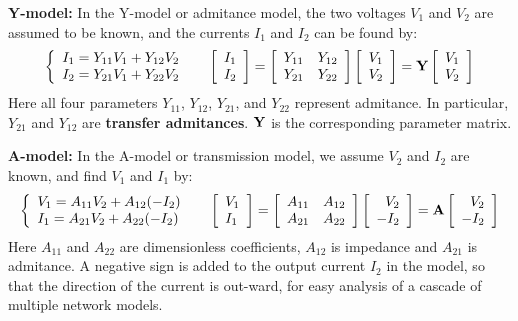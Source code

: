 {\bf Y-model:} In the Y-model or admitance model, the two voltages $V_1$ and $V_2$
are assumed to be known, and the currents $I_1$ and $I_2$ can be found by:
\[ \left\{ \begin{array}{l} I_1=Y_{11}V_1+Y_{12}V_2 \\
	I_2=Y_{21}V_1+Y_{22}V_2 \end{array} \right.\;\;\;\;\;
	\left[ \begin{array}{l} I_1 \\ I_2\end{array} \right]=
	\left[ \begin{array}{ll} Y_{11} & Y_{12}\\Y_{21} & Y_{22}\end{array}\right]
	\left[ \begin{array}{l} V_1 \\ V_2\end{array} \right]
	={\bf Y}\left[ \begin{array}{l} V_1 \\ V_2\end{array} \right]
\]
Here all four parameters $Y_{11}$, $Y_{12}$, $Y_{21}$, and $Y_{22}$ represent
admitance. In particular, $Y_{21}$ and $Y_{12}$ are {\bf transfer admitances}. 
${\bf Y}$ is the corresponding parameter matrix.

{\bf A-model:} In the A-model or transmission model, we assume $V_2$ and $I_2$
are known, and find $V_1$ and $I_1$ by:
\[\left\{ \begin{array}{l} 
	V_1=A_{11}V_2+A_{12}(-I_2) \\
	I_1=A_{21}V_2+A_{22}(-I_2) \end{array} \right.\;\;\;\;\;
	\left[ \begin{array}{l} V_1 \\ I_1\end{array} \right]=
	\left[ \begin{array}{ll} A_{11} & A_{12}\\A_{21} & A_{22}\end{array}\right]
	\left[ \begin{array}{r} V_2 \\ -I_2\end{array} \right]
	={\bf A}\left[ \begin{array}{r} V_2 \\ -I_2\end{array} \right]
\]
Here $A_{11}$ and $A_{22}$ are dimensionless coefficients, $A_{12}$ is impedance 
and $A_{21}$ is admitance. A negative sign is added to the output current $I_2$ 
in the model, so that the direction of the current is out-ward, for easy
analysis of a cascade of multiple network models.

